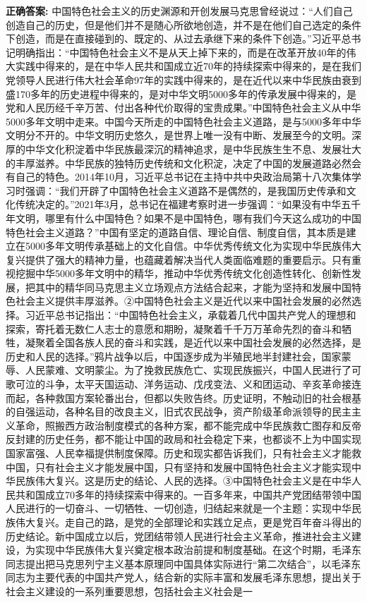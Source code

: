 \documentclass[12pt,UTF8]{ctexart}
\begin{document}
\textbf{正确答案:}
中国特色社会主义的历史渊源和开创发展马克思曾经说过：“人们自己创造自己的历史，但是他们并不是随心所欲地创造，并不是在他们自己选定的条件下创造，而是在直接碰到的、既定的、从过去承继下来的条件下创造。”习近平总书记明确指出：“中国特色社会主义不是从天上掉下来的，而是在改革开放40年的伟大实践中得来的，是在中华人民共和国成立近70年的持续探索中得来的，是在我们党领导人民进行伟大社会革命97年的实践中得来的，是在近代以来中华民族由衰到盛170多年的历史进程中得来的，是对中华文明5000多年的传承发展中得来的，是党和人民历经千辛万苦、付出各种代价取得的宝贵成果。”中国特色社会主义从中华5000多年文明中走来。中国今天所走的中国特色社会主义道路，是与5000多年中华文明分不开的。中华文明历史悠久，是世界上唯一没有中断、发展至今的文明。深厚的中华文化积淀着中华民族最深沉的精神追求，是中华民族生生不息、发展壮大的丰厚滋养。中华民族的独特历史传统和文化积淀，决定了中国的发展道路必然会有自己的特色。2014年10月，习近平总书记在主持中共中央政治局第十八次集体学习时强调：“我们开辟了中国特色社会主义道路不是偶然的，是我国历史传承和文化传统决定的。”2021年3月，总书记在福建考察时进一步强调：“如果没有中华五千年文明，哪里有什么中国特色？如果不是中国特色，哪有我们今天这么成功的中国特色社会主义道路？”中国有坚定的道路自信、理论自信、制度自信，其本质是建立在5000多年文明传承基础上的文化自信。中华优秀传统文化为实现中华民族伟大复兴提供了强大的精神力量，也蕴藏着解决当代人类面临难题的重要启示。只有重视挖掘中华5000多年文明中的精华，推动中华优秀传统文化创造性转化、创新性发展，把其中的精华同马克思主义立场观点方法结合起来，才能为坚持和发展中国特色社会主义提供丰厚滋养。②中国特色社会主义是近代以来中国社会发展的必然选择。习近平总书记指出：“中国特色社会主义，承载着几代中国共产党人的理想和探索，寄托着无数仁人志士的意愿和期盼，凝聚着千千万万革命先烈的奋斗和牺牲，凝聚着全国各族人民的奋斗和实践，是近代以来中国社会发展的必然选择，是历史和人民的选择。”鸦片战争以后，中国逐步成为半殖民地半封建社会，国家蒙辱、人民蒙难、文明蒙尘。为了挽救民族危亡、实现民族振兴，中国人民进行了可歌可泣的斗争，太平天国运动、洋务运动、戊戌变法、义和团运动、辛亥革命接连而起，各种救国方案轮番出台，但都以失败告终。历史证明，不触动旧的社会根基的自强运动，各种名目的改良主义，旧式农民战争，资产阶级革命派领导的民主主义革命，照搬西方政治制度模式的各种方案，都不能完成中华民族救亡图存和反帝反封建的历史任务，都不能让中国的政局和社会稳定下来，也都谈不上为中国实现国家富强、人民幸福提供制度保障。历史和现实都告诉我们，只有社会主义才能救中国，只有社会主义才能发展中国，只有坚持和发展中国特色社会主义才能实现中华民族伟大复兴。这是历史的结论、人民的选择。③中国特色社会主义是在中华人民共和国成立70多年的持续探索中得来的。一百多年来，中国共产党团结带领中国人民进行的一切奋斗、一切牺牲、一切创造，归结起来就是一个主题：实现中华民族伟大复兴。走自己的路，是党的全部理论和实践立足点，更是党百年奋斗得出的历史结论。新中国成立以后，党团结带领人民进行社会主义革命，推进社会主义建设，为实现中华民族伟大复兴奠定根本政治前提和制度基础。在这个时期，毛泽东同志提出把马克思列宁主义基本原理同中国具体实际进行“第二次结合”，以毛泽东同志为主要代表的中国共产党人，结合新的实际丰富和发展毛泽东思想，提出关于社会主义建设的一系列重要思想，包括社会主义社会是一
\end{document}
